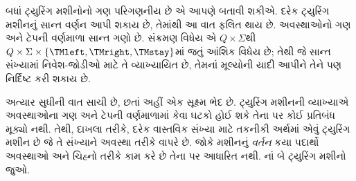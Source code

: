 \begin{explain}
બધાં ટ્યુરિંગ મશીનોનો ગણ પરિગણનીય છે એ આપણે બતાવી શકીએ.
દરેક ટ્યુરિંગ મશીનનું સાન્ત વર્ણન આપી શકાય છે, તેમાંથી આ
વાત ફલિત થાય છે. અવસ્થાઓનો ગણ અને ટેપની વર્ણમાળા સાન્ત
ગણો છે. સંક્રમણ વિધેય એ $Q \times \Sigma$થી
$Q \times \Sigma \times \{\TMleft, \TMright, \TMstay\}$માં
જતું આંશિક વિધેય છે; તેથી જે સાન્ત સંખ્યામાં નિવેશ-જોડીઓ માટે તે
વ્યાખ્યાયિત છે, તેમનાં મૂલ્યોની યાદી આપીને તેને પણ
નિર્દિષ્ટ કરી શકાય છે.

અત્યાર સુધીની વાત સાચી છે, છતાં અહીં એક સૂક્ષ્મ ભેદ છે.
ટ્યુરિંગ મશીનની વ્યાખ્યાએ અવસ્થાઓના ગણ અને ટેપની
વર્ણમાળામાં કેવા ઘટકો હોઈ શકે તેના પર કોઈ
પ્રતિબંધ મૂક્યો નથી. તેથી, દાખલા તરીકે, દરેક વાસ્તવિક
સંખ્યા માટે તકનીકી અર્થમાં એવું ટ્યુરિંગ મશીન છે જે તે
સંખ્યાને અવસ્થા તરીકે વાપરે છે. જોકે મશીનનું \emph{વર્તન}
કયા પદાર્થો અવસ્થાઓ અને ચિહ્નો તરીકે કામ કરે છે તેના પર
આધારિત નથી. નાં બે ટ્યુરિંગ મશીનો જુઓ.
\begin{figure}
\begin{center}
\\
\end{center}
\end{figure}
\end{explain}
